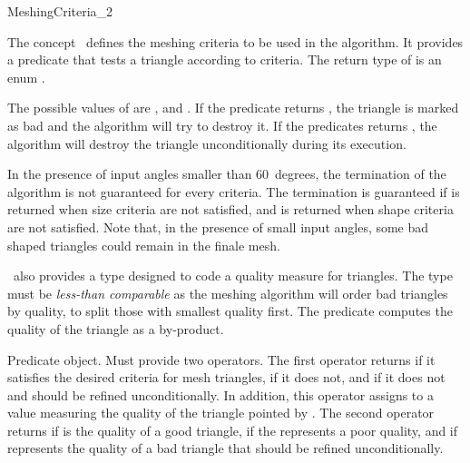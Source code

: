 \begin{ccRefConcept}{MeshingCriteria_2}

\ccDefinition

The concept \ccRefName\ defines the meshing criteria to be used in the
algorithm. It provides a predicate  that tests a triangle
according to criteria. The return type of  is an enum
.

The possible values of  are ,
 and . If the predicate returns ,
the triangle is marked as bad and the algorithm will try to destroy it. If
the predicates returns , the algorithm will destroy
the triangle unconditionally during its execution.

In the presence of input angles smaller than $60$~degrees, the termination
of the algorithm is not guaranteed for every criteria. The termination is
guaranteed if  is returned when size criteria are not
satisfied, and  is returned when shape criteria are not satisfied.
Note that, in the presence of small input angles, some bad shaped triangles
could remain in the finale mesh.


\ccRefName\ also provides a type  designed to code a quality
measure for triangles.  The type  must be \emph{less-than
  comparable} as the meshing algorithm will order bad triangles by quality,
to split those with smallest quality first. The predicate 
computes the quality of the triangle as a by-product.

\ccTypes



 {Predicate object. Must provide two operators. The
  first operator  returns  if it satisfies the desired criteria
  for mesh triangles,  if it does not, and 
  if it does not and should be refined unconditionally. In addition, this
  operator assigns to  a value measuring the quality of the triangle
  pointed by . The second operator  returns  if  is the quality
  of a good triangle,  if the  represents a poor quality,
  and  if  represents the quality of a bad
  triangle that should be refined unconditionally.}


\end{ccRefConcept}
